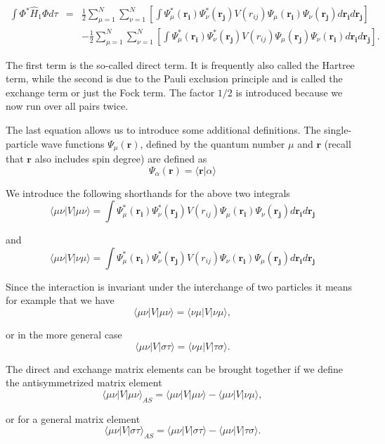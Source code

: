 \begin{eqnarray}
\label{eq:expectationH1}
\int \Phi^*\hat{H}_1 \Phi d\tau &=& \frac{1}{2} \sum_{\mu=1}^N \sum_{\nu=1}^N \left[ \int \Psi_\mu^*(\mathbf{r_i}) \Psi_\nu^*(\mathbf{r_j}) V(r_{ij}) \Psi_\mu(\mathbf{r_i}) \Psi_\nu(\mathbf{r_j}) d\mathbf{r_i} d\mathbf{r_j} \right]\\
& & -  \frac{1}{2} \sum_{\mu=1}^N \sum_{\nu=1}^N \left[ \int \Psi_\mu^*(\mathbf{r_i}) \Psi_\nu^*(\mathbf{r_j}) V(r_{ij}) \Psi_\mu(\mathbf{r_j}) \Psi_\nu(\mathbf{r_i}) d\mathbf{r_i} d\mathbf{r_j} \right].
\end{eqnarray}

The first term is the so-called direct term. It is frequently also called the Hartree term, while the second is due to the Pauli exclusion principle and is called the exchange term or just the Fock term. The factor $1/2$ is introduced because we now run over all pairs twice.

The last equation allows us to introduce some additional definitions. The single-particle wave functions $\Psi_\mu(\mathbf{r})$, defined by the quantum number $\mu$ and $\mathbf{r}$ (recall that $\mathbf{r}$ also includes spin degree) are defined as
\[
\Psi_\alpha(\mathbf{r})=\langle\mathbf{r} | \alpha \rangle
\]

We introduce the following shorthands for the above two integrals
\[
\langle \mu \nu |V| \mu \nu \rangle = \int \Psi_\mu^*(\mathbf{r_i}) \Psi_\nu^*(\mathbf{r_j}) V(r_{ij}) \Psi_\mu(\mathbf{r_i}) \Psi_\nu(\mathbf{r_j}) d\mathbf{r_i} d\mathbf{r_j}
\]

and
\[
\langle \mu \nu |V| \nu \mu \rangle = \int \Psi_\mu^*(\mathbf{r_i}) \Psi_\nu^*(\mathbf{r_j}) V(r_{ij}) \Psi_\nu(\mathbf{r_i}) \Psi_\mu(\mathbf{r_j}) d\mathbf{r_i} d\mathbf{r_j}
\]

Since the interaction is invariant under the interchange of two particles it means for example that we have
\[
\langle \mu \nu |V| \mu \nu \rangle = \langle \nu \mu |V| \nu \mu \rangle,
\]

or in the more general case
\[
\langle \mu \nu |V| \sigma \tau \rangle = \langle \nu \mu |V| \tau \sigma \rangle.
\]

The direct and exchange matrix elements can be brought together if we define the antisymmetrized matrix element
\[
\langle \mu \nu |V| \mu \nu \rangle_{AS} = \langle \mu \nu |V| \mu \nu \rangle - \langle \mu \nu |V| \nu \mu \rangle,
\]

or for a general matrix element
\[
\langle \mu \nu |V| \sigma \tau \rangle_{AS} = \langle \mu \nu |V| \sigma \tau \rangle - \langle \mu \nu |V| \tau \sigma \rangle.
\]


